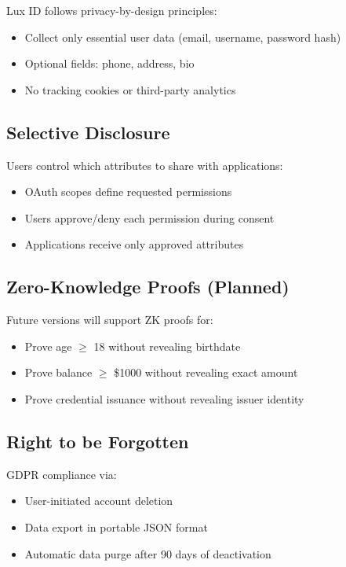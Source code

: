 \documentclass[11pt,a4paper]{article}
\begin{document}
Lux ID follows privacy-by-design principles:
\begin{itemize}
  \item Collect only essential user data (email, username, password hash)
  \item Optional fields: phone, address, bio
  \item No tracking cookies or third-party analytics
\end{itemize}

\subsection{Selective Disclosure}

Users control which attributes to share with applications:
\begin{itemize}
  \item OAuth scopes define requested permissions
  \item Users approve/deny each permission during consent
  \item Applications receive only approved attributes
\end{itemize}

\subsection{Zero-Knowledge Proofs (Planned)}

Future versions will support ZK proofs for:
\begin{itemize}
  \item Prove age $\geq$ 18 without revealing birthdate
  \item Prove balance $\geq$ \$1000 without revealing exact amount
  \item Prove credential issuance without revealing issuer identity
\end{itemize}

\subsection{Right to be Forgotten}

GDPR compliance via:
\begin{itemize}
  \item User-initiated account deletion
  \item Data export in portable JSON format
  \item Automatic data purge after 90 days of deactivation
\end{itemize}
\end{document}

